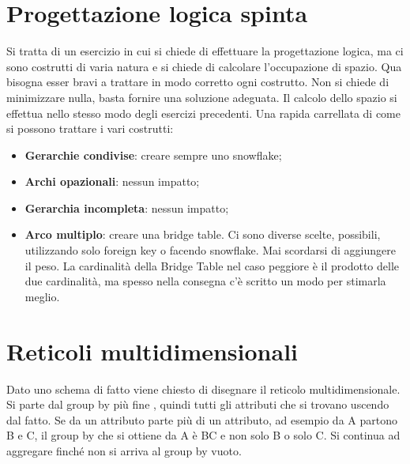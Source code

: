 \section{Progettazione logica spinta}
Si tratta di un esercizio in cui si chiede di effettuare la progettazione logica, ma ci sono costrutti di varia natura e si chiede di calcolare l'occupazione di spazio. Qua bisogna esser bravi a trattare in modo corretto ogni costrutto. Non si chiede di minimizzare nulla, basta fornire una soluzione adeguata. Il calcolo dello spazio si effettua nello stesso modo degli esercizi precedenti. Una rapida carrellata di come si possono trattare i vari costrutti:
\begin{itemize}
	\item \textbf{Gerarchie condivise}: creare sempre uno snowflake;
	\item \textbf{Archi opazionali}: nessun impatto;
	\item \textbf{Gerarchia incompleta}: nessun impatto;
	\item \textbf{Arco multiplo}: creare una bridge table. Ci sono diverse scelte, possibili, utilizzando solo foreign key o facendo snowflake. Mai scordarsi di aggiungere il peso. La cardinalità della Bridge Table nel caso peggiore è il prodotto delle due cardinalità, ma spesso nella consegna c'è scritto un modo per stimarla meglio.
\end{itemize}

\section{Reticoli multidimensionali}
Dato uno schema di fatto viene chiesto di disegnare il reticolo multidimensionale. Si parte dal group by più fine , quindi tutti gli attributi che si trovano uscendo dal fatto. Se da un attributo parte più di un attributo, ad esempio da A partono B e C, il group by che si ottiene da A è BC e non solo B o solo C. Si continua ad aggregare finché non si arriva al group by vuoto.
\newpage
